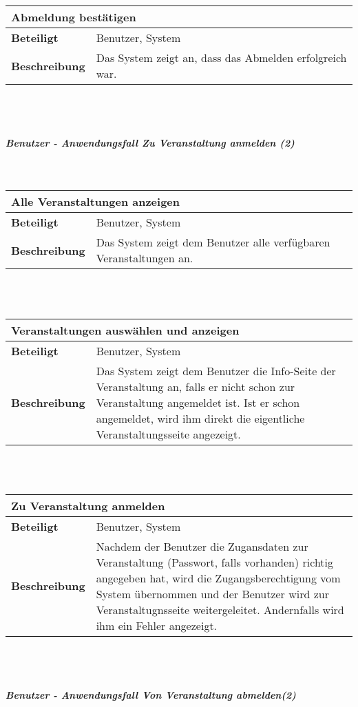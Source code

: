 \documentclass[12pt,a4paper]{article}
\begin{document}
\begin{tabular}{l p{10cm}}
\multicolumn{2}{l}{\textbf{Abmeldung bestätigen}} \\ \hline
\textbf{Beteiligt} & Benutzer, System \\ \hline 
\textbf{Beschreibung} & Das System zeigt an, dass das Abmelden erfolgreich war.\\ 
\hline 
\end{tabular}\\\\
\subparagraph{Benutzer - Anwendungsfall \glqq Zu Veranstaltung anmelden \grqq (2)}\mbox{}\\

\begin{tabular}{l p{10cm}}
\multicolumn{2}{l}{\textbf{Alle Veranstaltungen anzeigen}} \\ \hline
\textbf{Beteiligt} & Benutzer, System \\ \hline 
\textbf{Beschreibung} & Das System zeigt dem Benutzer alle verfügbaren Veranstaltungen an.\\ 
\hline 
\end{tabular}\\\\

\begin{tabular}{l p{10cm}}
\multicolumn{2}{l}{\textbf{Veranstaltungen auswählen und anzeigen}} \\ \hline
\textbf{Beteiligt} & Benutzer, System \\ \hline 
\textbf{Beschreibung} & Das System zeigt dem Benutzer die Info-Seite der Veranstaltung an, falls er nicht schon zur Veranstaltung angemeldet ist. Ist er schon angemeldet, wird ihm direkt die eigentliche Veranstaltungsseite angezeigt.\\ 
\hline 
\end{tabular}\\\\

\begin{tabular}{l p{10cm}}
\multicolumn{2}{l}{\textbf{Zu Veranstaltung anmelden}} \\ \hline
\textbf{Beteiligt} & Benutzer, System \\ \hline 
\textbf{Beschreibung} & Nachdem der Benutzer die Zugansdaten zur Veranstaltung (Passwort, falls vorhanden) richtig angegeben hat, wird die Zugangsberechtigung vom System übernommen und der Benutzer wird zur Veranstaltugnsseite weitergeleitet. Andernfalls wird ihm ein Fehler angezeigt.\\ 
\hline 
\end{tabular}\\\\
\subparagraph{Benutzer - Anwendungsfall \glqq Von Veranstaltung abmelden\grqq (2)}\mbox{}\\
\end{document}
